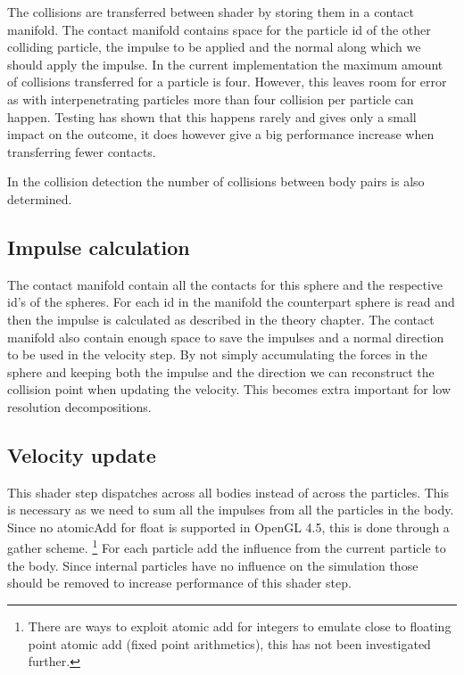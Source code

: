 The collisions are transferred between shader by storing them in a contact manifold.
The contact manifold contains space for the particle id of the other colliding particle,
the impulse to be applied and the normal along which we should apply the impulse.
In the current implementation the maximum amount of collisions transferred for a
particle is four. However, this leaves room for error as with interpenetrating particles
more than four collision per particle can happen. Testing has shown that this happens
rarely and gives only a small impact on the outcome, it does however give a big
performance increase when transferring fewer contacts.

In the collision detection the number of collisions between body pairs is also determined.

\subsection{Impulse calculation}
The contact manifold contain all the contacts for this sphere and the respective
id's of the spheres. For each id in the manifold the counterpart sphere is read and
then the impulse is calculated as described in the theory chapter. The contact manifold
also contain enough space to save the impulses and a normal direction to be used
in the velocity step. By not simply accumulating the forces in the sphere and keeping
both the impulse and the direction we can reconstruct the collision point when updating
the velocity. This becomes extra important for low resolution decompositions.

\subsection{Velocity update}
This shader step dispatches across all bodies instead of across the particles. This
is necessary as we need to sum all the impulses from all the particles in the body.
Since no atomicAdd for float is supported in OpenGL 4.5, this is done through a gather scheme.
\footnote{There are ways to exploit atomic add for integers to emulate close to floating point atomic add (fixed point arithmetics), this has not been investigated further.}
For each particle add the influence from the current particle to the body.
Since internal particles have no influence on the simulation
those should be removed to increase performance of this shader step.

